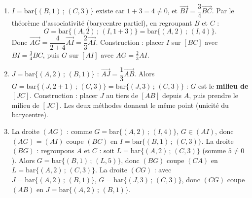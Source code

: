 \documentclass[11pt]{article}
\begin{document}
\begin{corrige}
\begin{enumerate}
\item $I=\mathrm{bar}\{(B,1)\,;\,(C,3)\}$ existe car $1+3=4\neq 0$, et $\overrightarrow{BI}=\dfrac{3}{4}\overrightarrow{BC}$. Par le théorème d'associativité (barycentre partiel), en regroupant $B$ et $C$ :
\[ G=\mathrm{bar}\{(A,2)\,;\,(I,1+3)\}=\mathrm{bar}\{(A,2)\,;\,(I,4)\}. \]
Donc $\overrightarrow{AG}=\dfrac{4}{2+4}\overrightarrow{AI}=\dfrac{2}{3}\overrightarrow{AI}$. Construction : placer $I$ sur $[BC]$ avec $BI=\frac34 BC$, puis $G$ sur $[AI]$ avec $AG=\frac23 AI$.
\item $J=\mathrm{bar}\{(A,2)\,;\,(B,1)\}$ : $\overrightarrow{AJ}=\dfrac{1}{3}\overrightarrow{AB}$. Alors $G=\mathrm{bar}\{(J,2+1)\,;\,(C,3)\}=\mathrm{bar}\{(J,3)\,;\,(C,3)\}$ : $G$ est le \textbf{milieu de $[JC]$}. Construction : placer $J$ au tiers de $[AB]$ depuis $A$, puis prendre le milieu de $[JC]$. Les deux méthodes donnent le même point (unicité du barycentre).
\item La droite $(AG)$ : comme $G=\mathrm{bar}\{(A,2)\,;\,(I,4)\}$, $G\in(AI)$, donc $(AG)=(AI)$ coupe $(BC)$ en $I=\mathrm{bar}\{(B,1)\,;\,(C,3)\}$.
La droite $(BG)$ : regroupons $A$ et $C$ : soit $L=\mathrm{bar}\{(A,2)\,;\,(C,3)\}$ (somme $5\neq 0$). Alors $G=\mathrm{bar}\{(B,1)\,;\,(L,5)\}$, donc $(BG)$ coupe $(CA)$ en $L=\mathrm{bar}\{(A,2)\,;\,(C,3)\}$.
La droite $(CG)$ : avec $J=\mathrm{bar}\{(A,2)\,;\,(B,1)\}$, $G=\mathrm{bar}\{(J,3)\,;\,(C,3)\}$, donc $(CG)$ coupe $(AB)$ en $J=\mathrm{bar}\{(A,2)\,;\,(B,1)\}$.
\end{enumerate}
\end{corrige}
\end{document}
